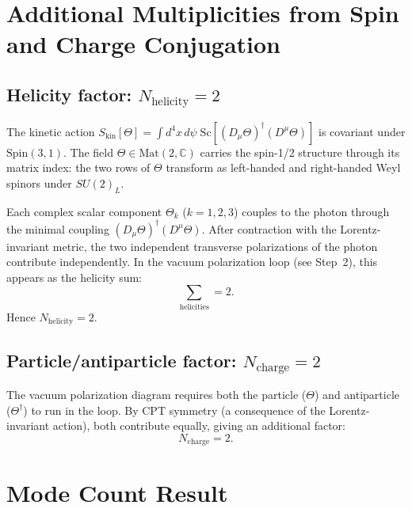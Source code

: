 \documentclass[12pt,a4paper]{article}
\theoremstyle{definition}
\theoremstyle{remark}
\newcommand{\C}{\mathbb{C}}
\begin{document}
\section{Additional Multiplicities from Spin and Charge Conjugation}
\label{sec:multiplicities}

\subsection{Helicity factor: $N_\mathrm{helicity} = 2$}

The kinetic action $S_\mathrm{kin}[\Theta] = \int d^4x\,d\psi\;
\mathrm{Sc}[(D_\mu\Theta)^\dagger(D^\mu\Theta)]$ is covariant under
$\mathrm{Spin}(3,1)$.  The field $\Theta \in \mathrm{Mat}(2,\C)$ carries
the spin-1/2 structure through its matrix index: the two rows of $\Theta$
transform as left-handed and right-handed Weyl spinors under $SU(2)_L$.

Each complex scalar component $\Theta_k$ ($k=1,2,3$) couples to the photon
through the minimal coupling $(D_\mu\Theta)^\dagger(D^\mu\Theta)$.  After
contraction with the Lorentz-invariant metric, the two independent
transverse polarizations of the photon contribute independently.  In the
vacuum polarization loop (see Step~2), this appears as the helicity sum:
\begin{equation}
  \sum_{\text{helicities}} = 2.
  \label{eq:helicity_sum}
\end{equation}
Hence $N_\mathrm{helicity} = 2$.

\subsection{Particle/antiparticle factor: $N_\mathrm{charge} = 2$}

The vacuum polarization diagram requires both the particle ($\Theta$) and
antiparticle ($\Theta^\dagger$) to run in the loop.  By CPT symmetry (a
consequence of the Lorentz-invariant action), both contribute equally, giving
an additional factor:
\begin{equation}
  N_\mathrm{charge} = 2.
  \label{eq:charge_factor}
\end{equation}

\section{Mode Count Result}
\label{sec:count}
\end{document}
